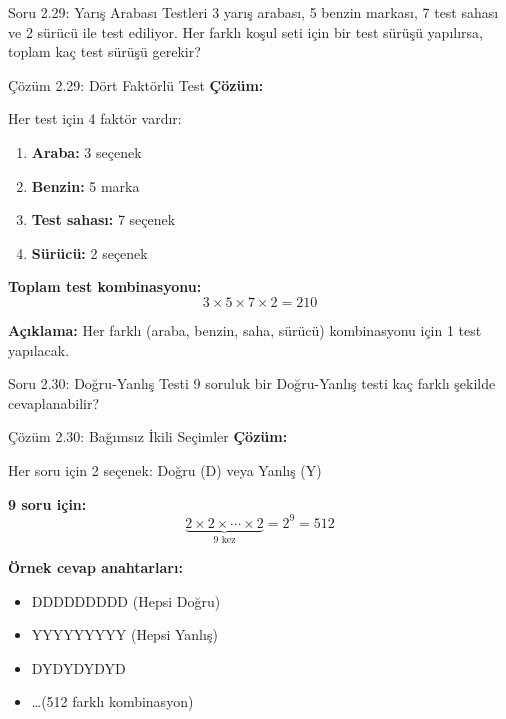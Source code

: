 \documentclass[light]{lutbeamer}
\begin{document}
\begin{frame}{Soru 2.29: Yarış Arabası Testleri}
    3 yarış arabası, 5 benzin markası, 7 test sahası ve 2 sürücü ile test ediliyor. Her farklı koşul seti için bir test sürüşü yapılırsa, toplam kaç test sürüşü gerekir?
\end{frame}

\begin{frame}{Çözüm 2.29: Dört Faktörlü Test}
    \color{blue}
    \textbf{Çözüm:}
    
    Her test için 4 faktör vardır:
    \begin{enumerate}
        \item \textbf{Araba:} 3 seçenek
        \item \textbf{Benzin:} 5 marka
        \item \textbf{Test sahası:} 7 seçenek
        \item \textbf{Sürücü:} 2 seçenek
    \end{enumerate}
    
    \vspace{0.3cm}
    \textbf{Toplam test kombinasyonu:}
    \[ 3 \times 5 \times 7 \times 2 = 210 \]
    
    \vspace{0.3cm}
    \textbf{Açıklama:} Her farklı (araba, benzin, saha, sürücü) kombinasyonu için 1 test yapılacak.
    
    \begin{center}
    \end{center}
\end{frame}

\begin{frame}{Soru 2.30: Doğru-Yanlış Testi}
    9 soruluk bir Doğru-Yanlış testi kaç farklı şekilde cevaplanabilir?
\end{frame}

\begin{frame}{Çözüm 2.30: Bağımsız İkili Seçimler}
    \color{blue}
    \textbf{Çözüm:}
    
    Her soru için 2 seçenek: Doğru (D) veya Yanlış (Y)
    
    \vspace{0.3cm}
    \textbf{9 soru için:}
    \[ \underbrace{2 \times 2 \times \cdots \times 2}_{9 \text{ kez}} = 2^9 = 512 \]
    
    \vspace{0.3cm}
    \textbf{Örnek cevap anahtarları:}
    \begin{itemize}
        \item DDDDDDDDD (Hepsi Doğru)
        \item YYYYYYYYY (Hepsi Yanlış)
        \item DYDYDYDYD
        \item \ldots (512 farklı kombinasyon)
    \end{itemize}
    
    \begin{center}
    \end{center}
\end{frame}
\end{document}
